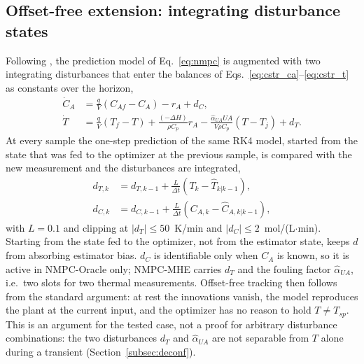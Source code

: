 \subsection{Offset-free extension: integrating disturbance states}
\label{subsec:offset_free}
Following \cite{muske2002disturbance, pannocchia2003disturbance}, the prediction model of Eq.~\eqref{eq:nmpc} is augmented with two integrating disturbances that enter the balances of Eqs.~\eqref{eq:cstr_ca}--\eqref{eq:cstr_t} as constants over the horizon,
\begin{equation}
    \begin{split}
    \dot C_A &= \tfrac{q}{V}(C_{Af} - C_A) - r_A + d_C, \\
    \dot T &= \tfrac{q}{V}(T_f - T) + \tfrac{(-\Delta H)}{\rho C_p} r_A - \tfrac{\hat\alpha_{UA} UA}{V \rho C_p}(T - T_j) + d_T .
    \end{split}
    \label{eq:disturbance_model}
\end{equation}
At every sample the one-step prediction of the same RK4 model, started from the state that was fed to the optimizer at the previous sample, is compared with the new measurement and the disturbances are integrated,
\begin{equation}
    \begin{split}
    d_{T,k} &= d_{T,k-1} + \frac{L}{\Delta t}\left(T_k - \hat T_{k|k-1}\right), \\
    d_{C,k} &= d_{C,k-1} + \frac{L}{\Delta t}\left(C_{A,k} - \hat C_{A,k|k-1}\right),
    \end{split}
    \label{eq:disturbance_update}
\end{equation}
with $L = 0.1$ and clipping at $|d_T| \le 50$~K/min and $|d_C| \le 2$~mol/(L$\cdot$min). Starting from the state fed to the optimizer, not from the estimator state, keeps $d$ from absorbing estimator bias. $d_C$ is identifiable only when $C_A$ is known, so it is active in NMPC-Oracle only; NMPC-MHE carries $d_T$ and the fouling factor $\hat\alpha_{UA}$, i.e.\ two slots for two thermal measurements. Offset-free tracking then follows from the standard argument: at rest the innovations vanish, the model reproduces the plant at the current input, and the optimizer has no reason to hold $T \ne T_{sp}$. This is an argument for the tested case, not a proof for arbitrary disturbance combinations: the two disturbances $d_T$ and $\hat\alpha_{UA}$ are not separable from $T$ alone during a transient (Section~\ref{subsec:deconf}).

